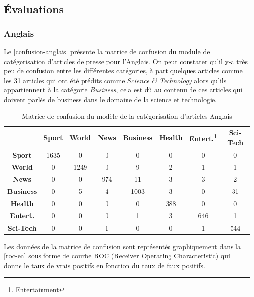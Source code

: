\subsection{Évaluations}
    \subsubsection{Anglais}
    Le \autoref{confusion-anglais} présente la matrice de confusion du module de catégorisation d'articles de presse pour l'Anglais. On peut constater qu'il y-a très peu de confusion entre les différentes catégories, à part quelques articles comme les 31 articles qui ont été prédits comme \emph{Science \& Technology} alors qu'ils appartiennent à la catégorie \emph{Business}, cela est dû au contenu de ces articles qui doivent parlés de business dans le domaine de la science et technologie. 
    \begin{table}[H]
        \begin{center}
            \begin{tabular}{|c|c|c|c|c|c|c|c|}
                \cline{2-8}
                \multicolumn{1}{c|}{} & \textbf{Sport} &  \textbf{World} &  \textbf{News} &  \textbf{Business} &  \textbf{Health} & \textbf{Entert.\footnote{Entertainment}} &  \textbf{Sci-Tech} \\
                \hline
                \textbf{Sport} & 1635 & 0 & 0 & 0 & 0 & 0 & 0 \\
                \textbf{World}  & 0 & 1249 & 0 & 9 & 2 & 1 & 1 \\
                \textbf{News}  & 0 & 0 & 974 & 11 & 3 & 3 & 2 \\
                \textbf{Business}  & 0 & 5 & 4 & 1003 & 3 & 0 & 31 \\
                \textbf{Health}  & 0 & 0 & 0 & 0 & 388 & 0 & 0 \\
                \textbf{Entert.}  & 0 & 0 & 0 & 1 & 3 & 646 & 1 \\
                \textbf{Sci-Tech}  & 0 & 0 & 1 & 0 & 0 & 1 & 544 \\
                \hline
            \end{tabular}
        \end{center}
        \caption{Matrice de confusion du modèle de la catégorisation d'articles Anglais}
        \label{confusion-anglais}
    \end{table}
    Les données de la matrice de confusion sont représentés graphiquement dans la \autoref{roc-en} sous forme de courbe ROC (Receiver Operating Characteristic) qui donne le taux de vrais positifs  en fonction du taux de faux positifs.
